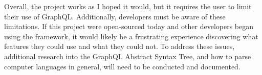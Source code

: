 Overall, the project works as I hoped it would, but it requires the user to limit their use of GraphQL.  Additionally, developers must be aware of these limitations.  If this project were open-sourced today and other developers began using the framework, it would likely be a frustrating experience discovering what features they could use and what they could not.  To address these issues, additional research into the GraphQL Abstract Syntax Tree, and how to parse computer languages in general, will need to be conducted and documented.